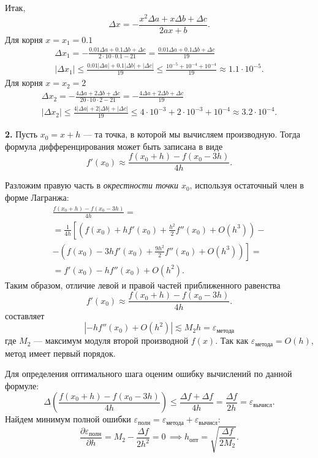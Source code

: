 \documentclass[12pt]{article}
\newcommand{\pd}[2]{\frac{\partial #1}{\partial #2}}
\renewcommand{\leq}{\leqslant}
\begin{document}
Итак, 
\[
\Delta x = -\frac{x^2 \Delta a + x \Delta b + \Delta c}{2ax + b}.
\]
Для корня $x = x_1 = 0.1$
\begin{gather*}
\Delta x_1 = -\frac{0.01 \Delta a + 0.1 \Delta b + \Delta c}{2 \cdot 10 \cdot 0.1 - 21} = \frac{0.01 \Delta a + 0.1 \Delta b + \Delta c}{19}\\
|\Delta x_1| \leq \frac{0.01 |\Delta a| + 0.1 |\Delta b| + |\Delta c|}{19} \leq \frac{10^{-5} + 10^{-4} + 10^{-4}}{19} \approx 1.1\cdot 10^{-5}.
\end{gather*}
Для корня $x = x_2 = 2$
\begin{gather*}
\Delta x_2 = -\frac{4 \Delta a + 2 \Delta b + \Delta c}{20 \cdot 10 \cdot 2 - 21 } = -\frac{4 \Delta a + 2 \Delta b + \Delta c}{19}\\
|\Delta x_2| \leq \frac{4 |\Delta a| + 2 |\Delta b| + |\Delta c|}{19} \leq 4 \cdot 10^{-3} + 2 \cdot 10^{-3} + 10^{-4} \approx 3.2\cdot 10^{-4}.
\end{gather*}

\textbf{2.} Пусть $x_0 = x + h$ --- та точка, в которой мы вычисляем производную. Тогда формула дифференцирования может быть записана в виде
\[
f'(x_0) \approx \frac{f(x_0 + h) - f(x_0 - 3h)}{4h}.
\]

Разложим правую часть в \emph{окрестности точки $x_0$}, используя остаточный член в форме Лагранжа:
\begin{multline*}
\frac{f(x_0 + h) - f(x_0 - 3h)}{4h} = \\ =
\frac{1}{4h} \left[
\left(
f(x_0) + h f'(x_0) + \frac{h^2}{2} f''(x_0)
+ O(h^3)
\right)
-\right. \\ -\left.
\left(
f(x_0) -3h f'(x_0) + \frac{9h^2}{2} f''(x_0)
+ O(h^3)
\right)
\right] = \\ =
f'(x_0) -h f''(x_0) + O(h^2).
\end{multline*}
Таким образом, отличие левой и правой частей приближенного равенства
\[
f'(x_0) \approx \frac{f(x_0 + h) - f(x_0 - 3h)}{4h}.
\]
составляет
\[
\left|-hf''(x_0) + O(h^2) \right| 
\lesssim M_2 h = \varepsilon_\text{метода}
\]
где $M_2$ --- максимум модуля второй производной $f(x)$. Так как $\varepsilon_\text{метода} = O(h)$, метод имеет первый порядок.

Для определения оптимального шага оценим ошибку вычислений по данной формуле:
\[
\Delta \left(
\frac{f(x_0+h) - f(x_0-3h)}{4h} 
\right) \leqslant 
\frac{\Delta f + \Delta f}{4h} = \frac{\Delta f}{2h} = \varepsilon_\text{вычисл}.
\]
Найдем минимум полной ошибки $\varepsilon_\text{полн} = \varepsilon_\text{метода} + \varepsilon_\text{вычисл}:$
\[
\pd{\varepsilon_\text{полн}}{h} = 
M_2 - \frac{\Delta f}{2h^2} = 0\, \implies
h_\text{опт} = \sqrt{\frac{\Delta f}{2M_2}}.
\]
\end{document}
